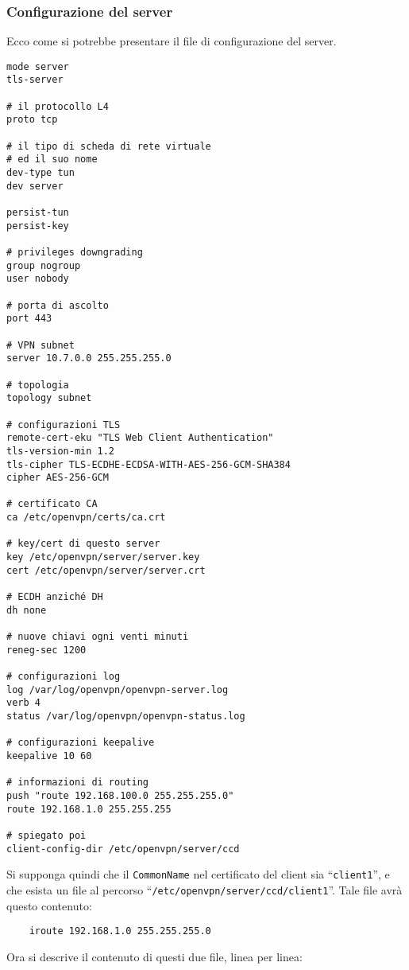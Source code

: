 \subsubsection{Configurazione del server}
Ecco come si potrebbe presentare
il file di configurazione del server.
\begin{verbatim}
mode server
tls-server
	
# il protocollo L4
proto tcp
	
# il tipo di scheda di rete virtuale
# ed il suo nome
dev-type tun
dev server
	
persist-tun
persist-key
	
# privileges downgrading
group nogroup
user nobody
	
# porta di ascolto
port 443
	
# VPN subnet
server 10.7.0.0 255.255.255.0
	
# topologia
topology subnet
	
# configurazioni TLS
remote-cert-eku "TLS Web Client Authentication"
tls-version-min 1.2
tls-cipher TLS-ECDHE-ECDSA-WITH-AES-256-GCM-SHA384
cipher AES-256-GCM
	
# certificato CA
ca /etc/openvpn/certs/ca.crt
	
# key/cert di questo server
key /etc/openvpn/server/server.key
cert /etc/openvpn/server/server.crt
	
# ECDH anziché DH
dh none
	
# nuove chiavi ogni venti minuti
reneg-sec 1200
	
# configurazioni log
log /var/log/openvpn/openvpn-server.log
verb 4
status /var/log/openvpn/openvpn-status.log
	
# configurazioni keepalive
keepalive 10 60
	
# informazioni di routing
push "route 192.168.100.0 255.255.255.0"
route 192.168.1.0 255.255.255
	
# spiegato poi
client-config-dir /etc/openvpn/server/ccd
\end{verbatim}
Si supponga quindi che il \texttt{CommonName} nel certificato del client sia
``\texttt{client1}'', e che esista un file al percorso
``\texttt{/etc/openvpn/server/ccd/client1}''. Tale file avrà questo contenuto:
\begin{verbatim}
	iroute 192.168.1.0 255.255.255.0
\end{verbatim}
Ora si descrive il contenuto di questi due file, linea per linea:
